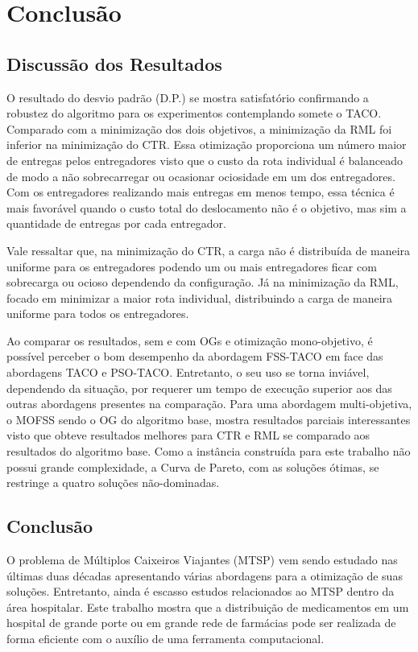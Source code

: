 \chapter{Conclusão}


\section{Discussão dos Resultados}

O resultado do desvio padrão (D.P.) se mostra satisfatório confirmando a robustez do algoritmo para os experimentos contemplando somete o TACO. Comparado com a minimização dos dois objetivos, a minimização da RML foi inferior na minimização do CTR. Essa otimização proporciona um número maior de entregas pelos entregadores visto que o custo da rota individual é balanceado de modo a não sobrecarregar ou ocasionar ociosidade em um dos entregadores. Com os entregadores realizando mais entregas em menos tempo, essa técnica é mais favorável quando o custo total do deslocamento não é o objetivo, mas sim a quantidade de entregas por cada entregador.

Vale ressaltar que, na minimização do CTR, a carga não é distribuída de maneira uniforme para os entregadores podendo um ou mais entregadores ficar com sobrecarga ou ocioso dependendo da configuração. Já na minimização da RML, focado em minimizar a maior rota individual, distribuindo a carga de maneira uniforme para todos os entregadores.

Ao comparar os resultados, sem e com OGs e otimização mono-objetivo, é possível perceber o bom desempenho da abordagem FSS-TACO em face das abordagens TACO e PSO-TACO. Entretanto, o seu uso se torna inviável, dependendo da situação, por requerer um tempo de execução superior aos das outras abordagens presentes na comparação. Para uma abordagem multi-objetiva, o MOFSS sendo o OG do algoritmo base, mostra resultados parciais interessantes visto que obteve resultados melhores para CTR e RML se comparado aos resultados do algoritmo base. Como a instância construída para este trabalho não possui grande complexidade, a Curva de Pareto, com as soluções ótimas, se restringe a quatro soluções não-dominadas.

\section{Conclusão}

O problema de Múltiplos Caixeiros Viajantes (MTSP) vem sendo estudado nas últimas duas décadas apresentando várias abordagens para a otimização de suas soluções. Entretanto, ainda é escasso estudos relacionados ao MTSP dentro da área hospitalar. Este trabalho mostra que a distribuição de medicamentos em um hospital de grande porte ou em grande rede de farmácias pode ser realizada de forma eficiente com o auxílio de uma ferramenta computacional.

